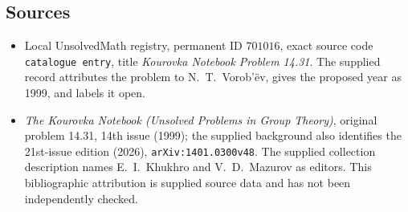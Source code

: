 \documentclass[11pt]{article}
\begin{document}
\subsection{Sources}
\begin{itemize}
\item Local UnsolvedMath registry, permanent ID \(701016\), exact source code \texttt{catalogue entry}, title \emph{Kourovka Notebook Problem 14.31}. The supplied record attributes the problem to N.\ T.\ Vorob'\"ev, gives the proposed year as 1999, and labels it open.
\item \emph{The Kourovka Notebook (Unsolved Problems in Group Theory)}, original problem 14.31, 14th issue (1999); the supplied background also identifies the 21st-issue edition (2026), \texttt{arXiv:1401.0300v48}. The supplied collection description names E.\ I.\ Khukhro and V.\ D.\ Mazurov as editors. This bibliographic attribution is supplied source data and has not been independently checked.
\end{itemize}
\end{document}
